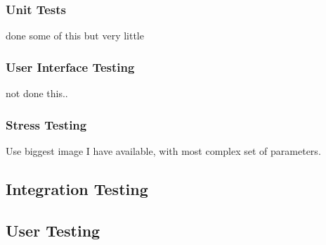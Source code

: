 \subsubsection{Unit Tests}

done some of this but very little

\subsubsection{User Interface Testing}

not done this..

\subsubsection{Stress Testing}

Use biggest image I have available, with most complex set of parameters.

\subsection{Integration Testing}

\subsection{User Testing}
